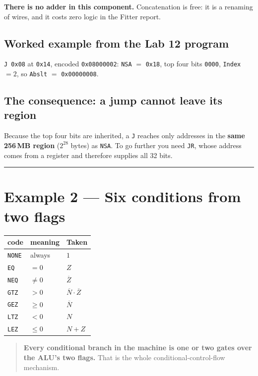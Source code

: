 \documentclass[11pt]{article}
\newcommand{\code}[1]{\texttt{#1}}
\newcommand{\hr}{\vspace{2pt}\hrule\vspace{6pt}}
\begin{document}
\textbf{There is no adder in this component.} Concatenation is free: it is a
renaming of wires, and it costs zero logic in the Fitter report.

\subsection*{Worked example from the Lab 12 program}

\code{J 0x08} at \code{0x14}, encoded \code{0x08000002}:
\code{NSA} $=$ \code{0x18}, top four bits \code{0000}, \code{Index} $= 2$, so
\code{Abslt} $=$ \code{0x00000008}.

\subsection*{The consequence: a jump cannot leave its region}

Because the top four bits are inherited, a \code{J} reaches only addresses in the
\textbf{same 256\,MB region} ($2^{28}$ bytes) as \code{NSA}. To go further you
need \code{JR}, whose address comes from a register and therefore supplies all 32
bits.

\vspace{4pt}\hr

\section*{Example 2 --- Six conditions from two flags}

\begin{center}
\begin{tabular}{lll}
\toprule
code & meaning & Taken \\
\midrule
\code{NONE} & always & $1$ \\
\code{EQ} & $=0$ & $Z$ \\
\code{NEQ} & $\neq 0$ & $\overline{Z}$ \\
\code{GTZ} & $>0$ & $\overline{N}\cdot\overline{Z}$ \\
\code{GEZ} & $\geq 0$ & $\overline{N}$ \\
\code{LTZ} & $<0$ & $N$ \\
\code{LEZ} & $\leq 0$ & $N + Z$ \\
\bottomrule
\end{tabular}
\end{center}

\begin{quote}
\textbf{Every conditional branch in the machine is one or two gates over the ALU's
two flags.} That is the whole conditional-control-flow mechanism.
\end{quote}
\end{document}
